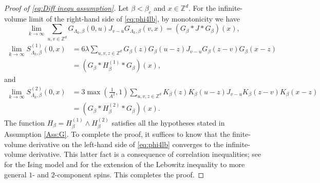 \documentclass[11pt,a4paper]{article}
\numberwithin{equation}{section}
\theoremstyle{plain}
\theoremstyle{definition}
\newcommand\1{\mathds{1}}
\begin{document}
\begin{proof}[Proof of \eqref{eq:Diff inequ assumption}]
Let $\beta<\beta_c$ and $x\in \mathbb Z^d$. For the infinite-volume limit of the right-hand side of \eqref{eq:phi4lb},
by monotonicity we have
 \begin{equation}
 	\lim_{k\rightarrow \infty}\sum_{u,v\in \mathbb Z^d}G_{\Lambda_k,\beta}(0,u)J_{v-u}G_{\Lambda_k,\beta}(v,x)=(G_\beta*J*G_\beta)(x),
 \end{equation}
 \begin{align}\nonumber
 	\lim_{k\rightarrow \infty}S_{\Lambda_k,\beta}^{(1)}(0,x)&=6\lambda\sum_{u,v,z\in \mathbb Z^d}G_\beta(z)G_\beta(u-z)J_{v-u}G_{\beta}(z-v)G_\beta(x-z)
 	\\&=(G_\beta*H_\beta^{(1)}*G_\beta)(x),
 \end{align}
and
 \begin{align}\nonumber
 	\lim_{k\rightarrow \infty}S_{\Lambda_k,\beta}^{(2)}(0,x)&=3\max \left(\frac{1}{A^2},1\right)  \sum_{u,v,z\in \mathbb Z^d} K_\beta(z)K_\beta(u-z)J_{v-u}K_\beta(z-v)K_\beta(x-z) 	\\&=(G_\beta*H_\beta^{(2)}*G_\beta)(x).
 \end{align}
The function $H_\beta =H^{(1)}_\beta\wedge H^{(2)}_\beta$ satisfies all the hypotheses stated in Assumption \ref{Ass:G}.
To complete the proof, it suffices to know that the finite-volume derivative
on the left-hand side of \eqref{eq:phi4lb} converges to the infinite-volume
derivative. This latter fact is a consequence of correlation inequalities; see \cite{Lebo72}
for the Ising model and \cite{BFS82} for the extension of the Lebowitz inequality
to more general $1$- and $2$-component spins.
This completes the proof.
\end{proof}
\end{document}
